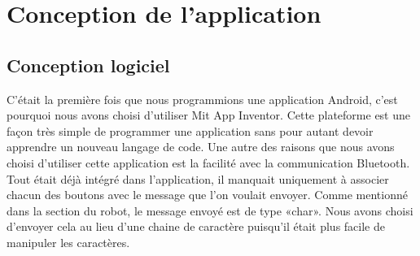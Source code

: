\section{Conception de l'application}

\subsection{Conception logiciel}

C’était la première fois que nous programmions une application Android, c’est pourquoi nous avons choisi d’utiliser Mit App Inventor.
Cette plateforme est une façon très simple de programmer une application sans pour autant devoir apprendre un nouveau langage de code.
Une autre des raisons que nous avons choisi d’utiliser cette application est la facilité avec la communication Bluetooth.
Tout était déjà intégré dans l’application, il manquait uniquement à associer chacun des boutons avec le message que l’on voulait envoyer.
Comme mentionné dans la section du robot, le message envoyé est de type «char».
Nous avons choisi d’envoyer cela au lieu d’une chaine de caractère puisqu’il était plus facile de manipuler les caractères.
